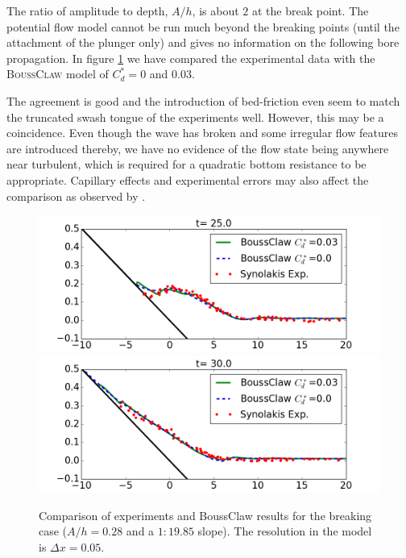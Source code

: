 \documentclass[review]{elsarticle}
\newcommand{\BoussClaw}{\textsc{BoussClaw} }
\begin{document}
The ratio of amplitude to depth, $A/h$, 
is about $2$ at the break point.
The potential flow model cannot be run much beyond the
breaking points (until the attachment of the plunger only) and 
gives no information on the following bore propagation.
In figure \ref{fig:BoussClaw_runup} we have compared
the experimental data with the \BoussClaw model 
of $C_d^* = 0$ and $0.03$.

The agreement is good and the introduction of bed-friction 
even seem to match the truncated swash tongue of the experiments well. However, this may be a coincidence. 
Even though the  wave has broken and some irregular flow features are introduced thereby, we have no evidence of the flow state being
anywhere near turbulent, which is required for a quadratic bottom resistance to be appropriate. 
Capillary effects and 
experimental errors may also affect the comparison
as observed by \cite{Pedersen:2013}.

\begin{figure}[tbh!]
	\centering
	\includegraphics[width=.8\textwidth]{_fig/BoussClaw_lab_Cd_t25}\\
	\includegraphics[width=.8\textwidth]{_fig/BoussClaw_lab_Cd_t30}
	\caption{Comparison of experiments  and BoussClaw results
                 for the breaking case ($A/h=0.28$ and a $1:19.85$ slope). 
		The resolution in the model is $\Delta x = 0.05$.}
	\label{fig:BoussClaw_runup}
\end{figure}
\end{document}
